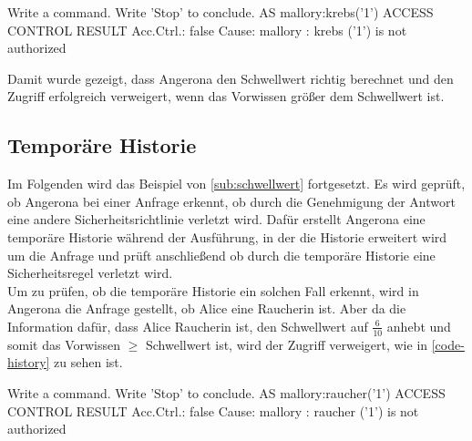 \documentclass[german,version-2020-11]{uzl-thesis}
\begin{document}
\begin{Pseudocode}[caption={Angerona Ergebnis für Schwellwert=$\frac{34}{80}$}, label={code-thresholdNoAccess}]
Write a command. Write 'Stop' to conclude.
AS mallory:krebs('1')
ACCESS CONTROL RESULT
	Acc.Ctrl.: false Cause: mallory : krebs ('1') is not authorized
\end{Pseudocode}

Damit wurde gezeigt, dass Angerona den Schwellwert richtig berechnet und den Zugriff erfolgreich verweigert, wenn das Vorwissen größer dem Schwellwert ist.

\subsection{Temporäre Historie}
Im Folgenden wird das Beispiel von \cref{sub:schwellwert} fortgesetzt. Es wird geprüft, ob Angerona bei einer Anfrage erkennt, ob durch die Genehmigung der Antwort eine andere Sicherheitsrichtlinie verletzt wird. Dafür erstellt Angerona eine temporäre Historie während der Ausführung, in der die Historie erweitert wird um die Anfrage und prüft anschließend ob durch die temporäre Historie eine Sicherheitsregel verletzt wird. \\ 
Um zu prüfen, ob die temporäre Historie ein solchen Fall erkennt, wird in Angerona die Anfrage gestellt, ob Alice eine Raucherin ist. Aber da die Information dafür, dass Alice Raucherin ist, den Schwellwert auf $\frac{6}{10}$ anhebt und somit das Vorwissen $\geq$ Schwellwert ist, wird der Zugriff verweigert, wie in \autoref{code-history} zu sehen ist. 

\begin{Pseudocode}[caption={Angerona Ergebnis für die Abfrage, ob Alice Raucherin ist}, label={code-history}]
Write a command. Write 'Stop' to conclude.
AS mallory:raucher('1')
ACCESS CONTROL RESULT
	Acc.Ctrl.: false Cause: mallory : raucher ('1') is not authorized
\end{Pseudocode}
\end{document}

